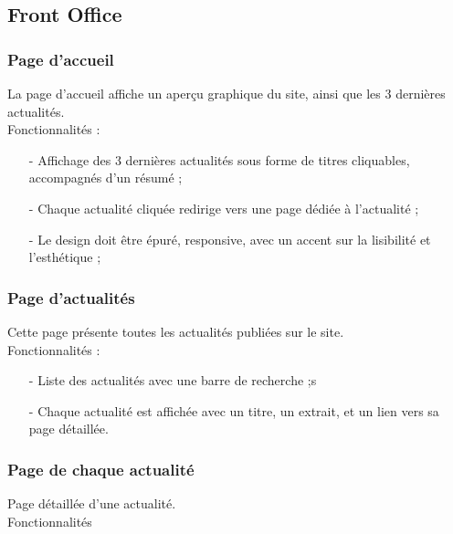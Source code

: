 \documentclass[12pt,a4paper]{article}
\begin{document}
\subsection{Front Office}

\subsubsection{Page d'accueil}

    La page d’accueil affiche un aperçu graphique du site, ainsi que les 3 dernières actualités. \\
    
    Fonctionnalités :
    
    \begin{itemize}
    	\item[-] Affichage des 3 dernières actualités sous forme de titres cliquables, accompagnés d'un résumé ;
    	\item[-] Chaque actualité cliquée redirige vers une page dédiée à l’actualité ;
    	\item[-] Le design doit être épuré, responsive, avec un accent sur la lisibilité et l’esthétique ;
    \end{itemize}
        

\subsubsection{Page d’actualités}

    Cette page présente toutes les actualités publiées sur le site.\\
    
    Fonctionnalités :
    
        
	\begin{itemize}
    		\item[-] Liste des actualités avec une barre de recherche ;s
    		\item[-] Chaque actualité est affichée avec un titre, un extrait, et un lien vers sa page détaillée.
    \end{itemize}
        

\subsubsection{Page de chaque actualité}

    Page détaillée d'une actualité.\\
    
    Fonctionnalités 
    
\end{document}

